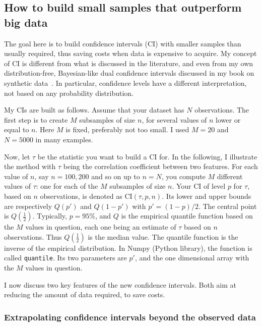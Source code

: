 \documentclass[oneside,10pt]{book}
\begin{document}
\subsection{How to build small samples that outperform big data}\label{trwsd}

The goal here is to build confidence intervals (CI) with smaller samples than usually required, thus saving costs when data is expensive to acquire. My  concept of CI is different from what is discussed in the literature, and even from my own distribution-free, Bayesian-like dual confidence intervals discussed in my book on synthetic data~\cite{vgelsevier}.  In particular,
 \textcolor{index}{confidence levels} have a different interpretation, not based on any probability distribution.

My CIs are built as follows. Assume that your dataset has $N$ observations.   The first step is to create $M$ subsamples of size $n$,
  for several values of $n$ lower or equal to $n$. Here $M$ is fixed, preferably not too small. I used $M=20$ and $N=5000$ in many examples.

Now, let $\tau$ be the statistic you want to build a CI for. In the following, I illustrate the method with $\tau$ being the correlation coefficient between two features. For each value of $n$, say $n=100, 200$ and so on up to $n=N$, you compute $M$ different values of $\tau$: one for each of the $M$ subsamples of size $n$.  Your CI of level $p$ for $\tau$, based on $n$ observations,
is denoted as $\text{CI}(\tau, p, n)$.
 Its lower and upper bounds are respectively $Q(p')$ and $Q(1-p')$ with $p' = (1-p)/2$. The
 central point is $Q(\frac{1}{2})$. Typically, $p = 95\%$, and $Q$ is the
 \textcolor{index}{empirical quantile function} based on the $M$ values in question, each one being an estimate of $\tau$ based on $n$ observations. Thus $Q(\frac{1}{2})$ is the median value.
The quantile function is the inverse of the \textcolor{index}{empirical distribution}.
 In Numpy (Python library), the function is called \texttt{quantile}. Its two parameters are $p'$, and the one dimensional array with the $M$ values in question.

I now discuss two key features of the new confidence intervals. Both aim at reducing the amount of data required, to save costs.

\subsubsection{Extrapolating confidence intervals beyond the observed data}\label{hgboutght}
\end{document}
